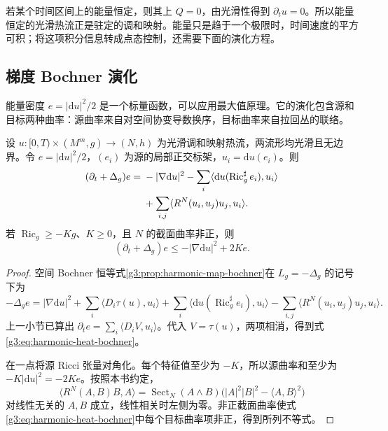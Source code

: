 若某个时间区间上的能量恒定，则其上 \(Q=0\)，由光滑性得到 \(\partial_tu=0\)。所以能量恒定的光滑热流正是驻定的调和映射。能量只是趋于一个极限时，时间速度的平方可积；将这项积分信息转成点态控制，还需要下面的演化方程。

\subsection{梯度 Bochner 演化}
\label{g3:subsec:2603:03}
能量密度 \(e=|\mathrm du|^2/2\) 是一个标量函数，可以应用最大值原理。它的演化包含源和目标两种曲率：源曲率来自对空间协变导数换序，目标曲率来自拉回丛的联络。

\begin{proposition}\label{g3:prop:harmonic-heat-bochner}
	设 \(u:[0,T)\times(M^m,g)\to(N,h)\) 为光滑调和映射热流，两流形均光滑且无边界。令 \(e=|\mathrm du|^2/2\)，\((e_i)\) 为源的局部正交标架，\(u_i=\mathrm du(e_i)\)。则
	\begin{align}
		(\partial_t+\Delta_g)e
		={}&-|\nabla\mathrm du|^2
		-\sum_i\langle\mathrm du(\operatorname{Ric}_g^\sharp e_i),u_i\rangle\notag\\
		&+\sum_{i,j}\langle R^N(u_i,u_j)u_j,u_i\rangle.
		\label{g3:eq:harmonic-heat-bochner}
	\end{align}
	若 \(\operatorname{Ric}_g\ge-Kg\)、\(K\ge0\)，且 \(N\) 的截面曲率非正，则
	\begin{equation}\label{g3:eq:harmonic-heat-energy-subsolution}
		(\partial_t+\Delta_g)e\le-|\nabla\mathrm du|^2+2Ke.
	\end{equation}
\end{proposition}
\begin{proof}
	空间 Bochner 恒等式\cref{g3:prop:harmonic-map-bochner}在 \(L_g=-\Delta_g\) 的记号下为
	\[
		-\Delta_ge=|\nabla\mathrm du|^2
		+\sum_i\langle D_i\tau(u),u_i\rangle
		+\sum_i\langle\mathrm du(\operatorname{Ric}_g^\sharp e_i),u_i\rangle
		-\sum_{i,j}\langle R^N(u_i,u_j)u_j,u_i\rangle.
	\]
	上一小节已算出 \(\partial_te=\sum_i\langle D_iV,u_i\rangle\)。代入 \(V=\tau(u)\)，两项相消，得到式\eqref{g3:eq:harmonic-heat-bochner}。

	在一点将源 Ricci 张量对角化。每个特征值至少为 \(-K\)，所以源曲率和至少为 \(-K|\mathrm du|^2=-2Ke\)。按照本书约定，
	\[
		\langle R^N(A,B)B,A\rangle
		=\operatorname{Sect}_N(A\wedge B)
		\bigl(|A|^2|B|^2-\langle A,B\rangle^2\bigr)
	\]
	对线性无关的 \(A,B\) 成立，线性相关时左侧为零。非正截面曲率使式\eqref{g3:eq:harmonic-heat-bochner}中每个目标曲率项非正，得到所列不等式。
\end{proof}

